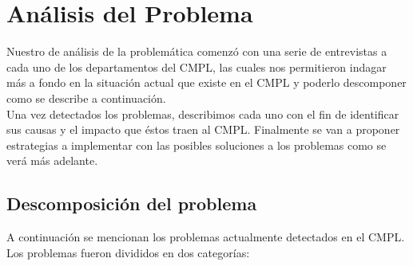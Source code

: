 \section{Análisis del Problema}
Nuestro de análisis de la problemática comenzó con una serie de entrevistas a cada uno de los departamentos del CMPL, las cuales nos permitieron indagar más a fondo en la situación actual que existe en el CMPL y poderlo descomponer como se describe a continuación.\\
	
Una vez detectados los problemas, describimos cada uno con el fin de identificar sus causas y el impacto que éstos traen al CMPL. Finalmente se van a proponer estrategias a implementar con las posibles soluciones a los problemas como se verá más adelante. 
	\subsection{Descomposición del problema}
	A continuación se mencionan los problemas actualmente detectados en el CMPL. Los problemas fueron divididos en dos categorías:
	
